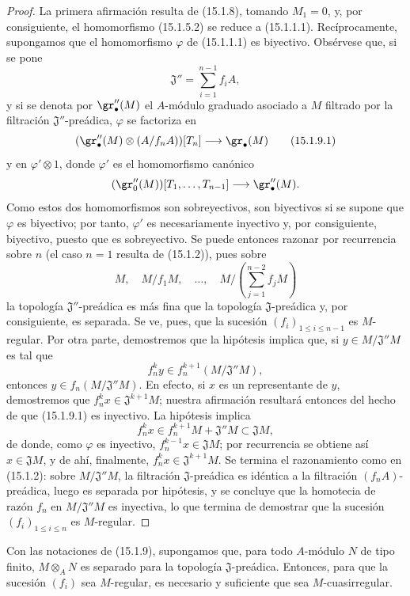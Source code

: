 \begin{proof}
La primera afirmación resulta de (15.1.8), tomando $M_1=0$, y, por
consiguiente, el homomorfismo (15.1.5.2) se reduce a (15.1.1.1).
Recíprocamente, supongamos que el homomorfismo $\varphi$ de (15.1.1.1) es
biyectivo. Obsérvese que, si se pone
\[
  \mathfrak{J}''=\sum_{i=1}^{n-1}f_iA,
\]
y si se denota por $\gr''_\bullet(M)$ el $A$-módulo graduado asociado a $M$
filtrado por la filtración $\mathfrak{J}''$-preádica, $\varphi$ se factoriza en
\[
  (\gr''_\bullet(M)\otimes(A/f_nA))[T_n]\longrightarrow\gr_\bullet(M)
  \tag{15.1.9.1}\label{0.15.1.9.1-es}
\]
y en $\varphi'\otimes1$, donde $\varphi'$ es el homomorfismo canónico
\[
  (\gr''_0(M))[T_1,\ldots,T_{n-1}]
  \longrightarrow\gr''_\bullet(M).
\]
Como estos dos homomorfismos son sobreyectivos, son biyectivos si se supone que
$\varphi$ es biyectivo; por tanto, $\varphi'$ es necesariamente inyectivo y,
por consiguiente, biyectivo, puesto que es sobreyectivo. Se puede entonces
razonar por recurrencia sobre $n$ (el caso $n=1$ resulta de (15.1.2)), pues
sobre
\[
  M,\quad M/f_1M,\quad\ldots,\quad
  M/\left(\sum_{j=1}^{n-2}f_jM\right)
\]
la topología $\mathfrak{J}''$-preádica es más fina que la topología
$\mathfrak{J}$-preádica y, por consiguiente, es separada. Se ve, pues, que la
sucesión $(f_i)_{1\leq i\leq n-1}$ es $M$-regular. Por otra parte, demostremos
que la hipótesis implica que, si $y\in M/\mathfrak{J}''M$ es tal que
\[
  f_n^ky\in f_n^{k+1}(M/\mathfrak{J}''M),
\]
entonces $y\in f_n(M/\mathfrak{J}''M)$. En efecto, si $x$ es un representante
de $y$, demostremos que $f_n^kx\in\mathfrak{J}^{k+1}M$; nuestra afirmación
resultará entonces del hecho de que (15.1.9.1) es inyectivo. La hipótesis
implica
\[
  f_n^kx\in f_n^{k+1}M+\mathfrak{J}''M\subset\mathfrak{J}M,
\]
de donde, como $\varphi$ es inyectivo,
$f_n^{k-1}x\in\mathfrak JM$; por recurrencia se obtiene así
$x\in\mathfrak{J}M$, y de ahí, finalmente,
$f_n^kx\in\mathfrak{J}^{k+1}M$. Se termina el razonamiento como en
(15.1.2): sobre $M/\mathfrak{J}''M$, la filtración
$\mathfrak{J}$-preádica es idéntica a la filtración
$(f_nA)$-preádica, luego es separada por hipótesis, y se concluye que la
homotecia de razón $f_n$ en $M/\mathfrak{J}''M$ es inyectiva, lo que termina
de demostrar que la sucesión $(f_i)_{1\leq i\leq n}$ es $M$-regular.
\end{proof}

\begin{corollary}[15.1.10]
\label{0.15.1.10-es}
Con las notaciones de \textup{(15.1.9)}, supongamos que, para todo $A$-módulo $N$ de
tipo finito, $M\otimes_A N$ es separado para la topología
$\mathfrak{J}$-preádica. Entonces, para que la sucesión $(f_i)$ sea
$M$-regular, es necesario y suficiente que sea $M$-cuasirregular.
\end{corollary}

